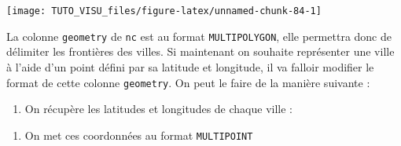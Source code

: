 \documentclass[]{article}
\newenvironment{Shaded}{\begin{snugshade}}{\end{snugshade}}
\newcommand{\KeywordTok}[1]{\textcolor[rgb]{0.13,0.29,0.53}{\textbf{#1}}}
\newcommand{\NormalTok}[1]{#1}
\newcommand{\OperatorTok}[1]{\textcolor[rgb]{0.81,0.36,0.00}{\textbf{#1}}}
\newcommand{\StringTok}[1]{\textcolor[rgb]{0.31,0.60,0.02}{#1}}
\providecommand{\tightlist}{%
  \setlength{\itemsep}{0pt}\setlength{\parskip}{0pt}}
\theoremstyle{definition}
\theoremstyle{definition}
\theoremstyle{definition}
\theoremstyle{remark}
\begin{document}
\begin{center}\texttt{[image: TUTO\_VISU\_files/figure-latex/unnamed-chunk-84-1]} \end{center}

La colonne \texttt{geometry} de \texttt{nc} est au format \texttt{MULTIPOLYGON}, elle permettra donc de délimiter les frontières des villes. Si maintenant on souhaite représenter une ville à l'aide d'un point défini par sa latitude et longitude, il va falloir modifier le format de cette colonne \texttt{geometry}. On peut le faire de la manière suivante :

\begin{enumerate}
\def\labelenumi{\arabic{enumi}.}
\tightlist
\item
  On récupère les latitudes et longitudes de chaque ville :
\end{enumerate}

\begin{Shaded}
\end{Shaded}

\begin{enumerate}
\def\labelenumi{\arabic{enumi}.}
\setcounter{enumi}{1}
\tightlist
\item
  On met ces coordonnées au format \texttt{MULTIPOINT}
\end{enumerate}
\end{document}
